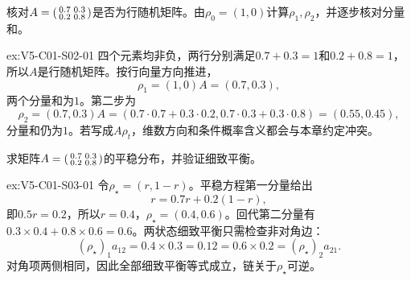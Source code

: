 \begin{SLChapterExercisePairSection}
\begin{exercise}\label{ex:V5-C01-S02-01}
核对$A=\begin{psmallmatrix}0.7&0.3\\0.2&0.8\end{psmallmatrix}$是否为行随机矩阵。由$\rho_0=(1,0)$计算$\rho_1,\rho_2$，并逐步核对分量和。
\end{exercise}
\ifSLFullEdition
{}\label{sol:V5-C01-S02-01}
\begin{chapterexercisesolution}{ex:V5-C01-S02-01}
四个元素均非负，两行分别满足$0.7+0.3=1$和$0.2+0.8=1$，所以$A$是行随机矩阵。按行向量方向推进，
\[
\rho_1=(1,0)A=(0.7,0.3),
\]
两个分量和为$1$。第二步为
\[
\rho_2=(0.7,0.3)A
=(0.7\cdot0.7+0.3\cdot0.2,
  0.7\cdot0.3+0.3\cdot0.8)
=(0.55,0.45),
\]
分量和仍为$1$。若写成$A\rho_t$，维数方向和条件概率含义都会与本章约定冲突。
\end{chapterexercisesolution}
\fi

\begin{exercise}\label{ex:V5-C01-S03-01}
求矩阵$A=\begin{psmallmatrix}0.7&0.3\\0.2&0.8\end{psmallmatrix}$的平稳分布，并验证细致平衡。
\end{exercise}
\ifSLFullEdition
{}\label{sol:V5-C01-S03-01}
\begin{chapterexercisesolution}{ex:V5-C01-S03-01}
令$\rho_\star=(r,1-r)$。平稳方程第一分量给出
\[
r=0.7r+0.2(1-r),
\]
即$0.5r=0.2$，所以$r=0.4$，$\rho_\star=(0.4,0.6)$。回代第二分量有$0.3\times0.4+0.8\times0.6=0.6$。两状态细致平衡只需检查非对角边：
\[
(\rho_\star)_1a_{12}=0.4\times0.3=0.12
=0.6\times0.2=(\rho_\star)_2a_{21}.
\]
对角项两侧相同，因此全部细致平衡等式成立，链关于$\rho_\star$可逆。
\end{chapterexercisesolution}
\fi


\end{SLChapterExercisePairSection}

